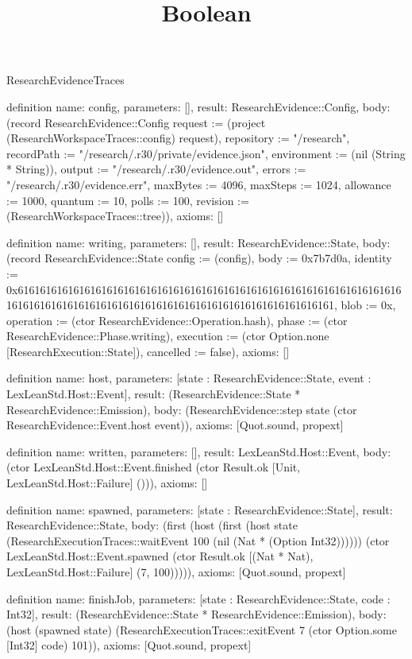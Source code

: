 \begin{lexlean}{ResearchEvidenceTraces}
\title{Boolean}
\begin{semanticmodule}

definition{
 name: config,
 parameters: [],
 result: ResearchEvidence::Config,
 body: (record ResearchEvidence::Config {request := (project (ResearchWorkspaceTraces::config) request), repository := "/research", recordPath := "/research/.r30/private/evidence.json", environment := (nil (String * String)), output := "/research/.r30/evidence.out", errors := "/research/.r30/evidence.err", maxBytes := 4096, maxSteps := 1024, allowance := 1000, quantum := 10, polls := 100, revision := (ResearchWorkspaceTraces::tree)}),
 axioms: []
}

definition{
 name: writing,
 parameters: [],
 result: ResearchEvidence::State,
 body: (record ResearchEvidence::State {config := (config), body := 0x7b7d0a, identity := 0x61616161616161616161616161616161616161616161616161616161616161616161616161616161616161616161616161616161616161616161616161616161, blob := 0x, operation := (ctor ResearchEvidence::Operation.hash), phase := (ctor ResearchEvidence::Phase.writing), execution := (ctor Option.none [ResearchExecution::State]), cancelled := false}),
 axioms: []
}

definition{
 name: host,
 parameters: [state : ResearchEvidence::State, event : LexLeanStd.Host::Event],
 result: (ResearchEvidence::State * ResearchEvidence::Emission),
 body: (ResearchEvidence::step state (ctor ResearchEvidence::Event.host event)),
 axioms: [Quot.sound, propext]
}

definition{
 name: written,
 parameters: [],
 result: LexLeanStd.Host::Event,
 body: (ctor LexLeanStd.Host::Event.finished (ctor Result.ok [Unit, LexLeanStd.Host::Failure] ())),
 axioms: []
}

definition{
 name: spawned,
 parameters: [state : ResearchEvidence::State],
 result: ResearchEvidence::State,
 body: (first (host (first (host state (ResearchExecutionTraces::waitEvent 100 (nil (Nat * (Option Int32)))))) (ctor LexLeanStd.Host::Event.spawned (ctor Result.ok [(Nat * Nat), LexLeanStd.Host::Failure] (7, 100))))),
 axioms: [Quot.sound, propext]
}

definition{
 name: finishJob,
 parameters: [state : ResearchEvidence::State, code : Int32],
 result: (ResearchEvidence::State * ResearchEvidence::Emission),
 body: (host (spawned state) (ResearchExecutionTraces::exitEvent 7 (ctor Option.some [Int32] code) 101)),
 axioms: [Quot.sound, propext]
}


\end{semanticmodule}
\end{lexlean}
